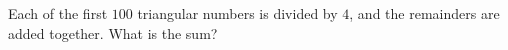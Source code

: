 Each of the first $100$ triangular numbers is divided by $4$, and the remainders are added together. What is the sum?
